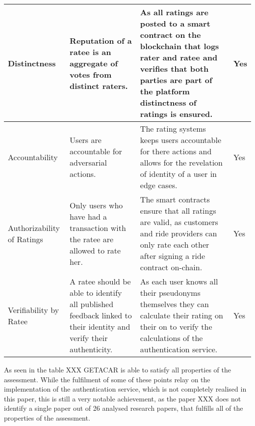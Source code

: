 \begin{longtable}{|p{3cm}|p{4.5cm}|p{5cm}|p{1.5cm}|}
\hline
Distinctness & Reputation of a ratee is an aggregate of votes from distinct raters. & As all ratings are posted to a smart contract on the blockchain that logs rater and ratee and verifies that both parties are part of the platform distinctness of ratings is ensured. & Yes\\
\hline
Accountability & Users are accountable for adversarial actions. & The rating systems keeps users accountable for there actions and allows for the revelation of identity of a user in edge cases.& Yes\\
\hline
Authorizability of Ratings & Only users who have had a transaction with the ratee are allowed to rate her. & The smart contracts ensure that all ratings are valid, as customers and ride providers can only rate each other after signing a ride contract on-chain.& Yes\\
\hline
Verifiability by Ratee & A ratee should be able to identify all published feedback linked to their identity and verify their authenticity. &As each user knows all their pseudonyms themselves they can calculate their rating on their on to verify the calculations of the authentication service.  & Yes\\
\hline
\end{longtable}

As seen in the table XXX GETACAR is able to satisfy all properties of the assessment. While the fulfilment of some of these points relay on the implementation of the authentication service, which is not completely realised in this paper, this is still a very notable achievement, as the paper XXX does not identify a single paper out of 26 analysed research papers, that fulfills all of the properties of the assessment.  